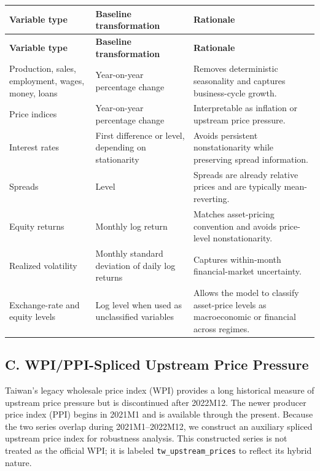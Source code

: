 \begin{center}
\small
\setlength{\tabcolsep}{5pt}
\renewcommand{\arraystretch}{1.1}
\begin{longtable}{p{4.2cm} p{5.2cm} p{5.8cm}}
\hline
\textbf{Variable type} & \textbf{Baseline transformation} & \textbf{Rationale} \\
\hline
\endfirsthead
\hline
\textbf{Variable type} & \textbf{Baseline transformation} & \textbf{Rationale} \\
\hline
\endhead
\hline
\endfoot
Production, sales, employment, wages, money, loans & Year-on-year percentage change & Removes deterministic seasonality and captures business-cycle growth. \\
Price indices & Year-on-year percentage change & Interpretable as inflation or upstream price pressure. \\
Interest rates & First difference or level, depending on stationarity & Avoids persistent nonstationarity while preserving spread information. \\
Spreads & Level & Spreads are already relative prices and are typically mean-reverting. \\
Equity returns & Monthly log return & Matches asset-pricing convention and avoids price-level nonstationarity. \\
Realized volatility & Monthly standard deviation of daily log returns & Captures within-month financial-market uncertainty. \\
Exchange-rate and equity levels & Log level when used as unclassified variables & Allows the model to classify asset-price levels as macroeconomic or financial across regimes. \\
\end{longtable}
\end{center}

\subsection*{C. WPI/PPI-Spliced Upstream Price Pressure}

\noindent Taiwan's legacy wholesale price index (WPI) provides a long historical measure of upstream price pressure but is discontinued after 2022M12. The newer producer price index (PPI) begins in 2021M1 and is available through the present. Because the two series overlap during 2021M1--2022M12, we construct an auxiliary spliced upstream price index for robustness analysis. This constructed series is not treated as the official WPI; it is labeled \texttt{tw\_upstream\_prices} to reflect its hybrid nature.

